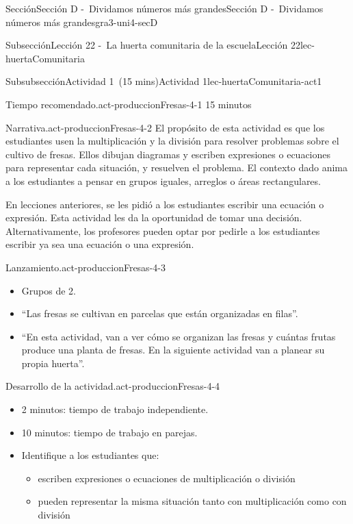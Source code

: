 \documentclass[oneside,10pt,]{article}
\begin{document}
\begin{sectionptx}{Sección}{Sección D -~Dividamos números más grandes}{}{Sección D -~Dividamos números más grandes}{}{}{gra3-uni4-secD}
\begin{subsectionptx}{Subsección}{Lección 22 -~La huerta comunitaria de la escuela}{}{Lección 22}{}{}{lec-huertaComunitaria}
\begin{subsubsectionptx}{Subsubsección}{Actividad 1~(15 mins)}{}{Actividad 1}{}{}{lec-huertaComunitaria-act1}
\begin{paragraphs}{Tiempo recomendado.}{act-produccionFresas-4-1}%
15 minutos%
\end{paragraphs}%
\begin{paragraphs}{Narrativa.}{act-produccionFresas-4-2}%
El propósito de esta actividad es que los estudiantes usen la multiplicación y la división para resolver problemas sobre el cultivo de fresas. Ellos dibujan diagramas y escriben expresiones o ecuaciones para representar cada situación, y resuelven el problema. El contexto dado anima a los estudiantes a pensar en grupos iguales, arreglos o áreas rectangulares.%
\par
En lecciones anteriores, se les pidió a los estudiantes escribir una ecuación o expresión. Esta actividad les da la oportunidad de tomar una decisión. Alternativamente, los profesores pueden optar por pedirle a los estudiantes escribir ya sea una ecuación o una expresión.%
\end{paragraphs}%
\begin{paragraphs}{Lanzamiento.}{act-produccionFresas-4-3}%
%
\begin{itemize}[label=\textbullet]
\item{}Grupos de 2.%
\item{}``Las fresas se cultivan en parcelas que están organizadas en filas''.%
\item{}``En esta actividad, van a ver cómo se organizan las fresas y cuántas frutas produce una planta de fresas. En la siguiente actividad van a planear su propia huerta''.%
\end{itemize}
\end{paragraphs}%
\begin{paragraphs}{Desarrollo de la actividad.}{act-produccionFresas-4-4}%
%
\begin{itemize}[label=\textbullet]
\item{}2 minutos: tiempo de trabajo independiente.%
\item{}10 minutos: tiempo de trabajo en parejas.%
\item{}Identifique a los estudiantes que:%
%
\begin{itemize}[label=$\circ$]
\item{}escriben expresiones o ecuaciones de multiplicación o división%
\item{}pueden representar la misma situación tanto con multiplicación como con división%
\end{itemize}
\end{itemize}
\end{paragraphs}%

\end{subsubsectionptx}
\end{subsectionptx}
\end{sectionptx}
\end{document}
